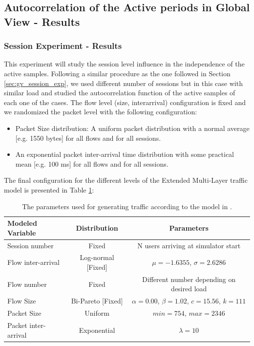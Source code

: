 \subsection{Autocorrelation of the Active periods in Global View - Results} \label{sec:autocorrelation_active_results}

\subsubsection{Session Experiment - Results} \label{subsec:autocorrelation_sessions}
This experiment will study the session level influence in the independence of the active samples. Following a similar procedure as the one followed in Section \ref{sec:gv_session_exp}, we used different number of sessions but in this case with similar load and studied the autocorrelation function of the active samples of each one of the cases. The flow level (size, interarrival) configuration is fixed and we randomized the packet level with the following configuration:

\begin{itemize}
\item Packet Size distribution: A uniform packet distribution with a normal average [e.g. 1550 bytes] for all flows and for all sessions.
\item An exponential packet inter-arrival time distribution with some practical mean [e.g. 100 ms] for all flows and for all sessions.
\end{itemize}

The final configuration for the different levels of the Extended Multi-Layer traffic model is presented in Table \ref{tab:traffic_autocorrelation_active_gv}:

\begin{table}[h!]
	\begin{center}
		\begin{tabular}{ l | c | c }
			Modeled Variable & Distribution & Parameters \\ \hline
			Session number	& Fixed & N users arriving at simulator start \\
			Flow inter-arrival & Log-normal [Fixed] & $\mu = -1.6355$, $\sigma = 2.6286$ \\
			Flow number & Fixed & Different number depending on desired load \\
			Flow Size & Bi-Pareto [Fixed] & $\alpha = 0.00$, $\beta = 1.02$, $c = 15.56$, $k = 111$ \\
			Packet Size & Uniform & $min = 754$, $max = 2346$ \\
			Packet inter-arrival & Exponential & $\lambda = 10$ \\
		\end{tabular}
		\caption{The parameters used for generating traffic according to the model in \cite{Campus-WLAN}.}
		\label{tab:traffic_autocorrelation_active_gv}
	\end{center}
\end{table}

